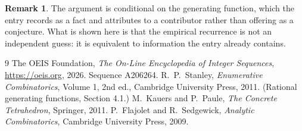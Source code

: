 \documentclass[11pt,a4paper]{article}
\theoremstyle{plain}
\theoremstyle{definition}
\newtheorem{remark}[theorem]{Remark}
\begin{document}
\begin{remark}
The argument is conditional on the generating function, which the entry records as a fact and
attributes to a contributor rather than offering as a conjecture. What is shown here is that
the empirical recurrence is not an independent guess: it is equivalent to information the
entry already contains.
\end{remark}

\begin{thebibliography}{9}
 The OEIS Foundation, \emph{The On-Line Encyclopedia of Integer
Sequences}, \url{https://oeis.org}, 2026. Sequence A206264.
 R.~P.~Stanley, \emph{Enumerative Combinatorics}, Volume 1, 2nd ed.,
Cambridge University Press, 2011. (Rational generating functions, Section 4.1.)
 M.~Kauers and P.~Paule, \emph{The Concrete Tetrahedron}, Springer, 2011.
 P.~Flajolet and R.~Sedgewick, \emph{Analytic Combinatorics}, Cambridge
University Press, 2009.
\end{thebibliography}
\end{document}
